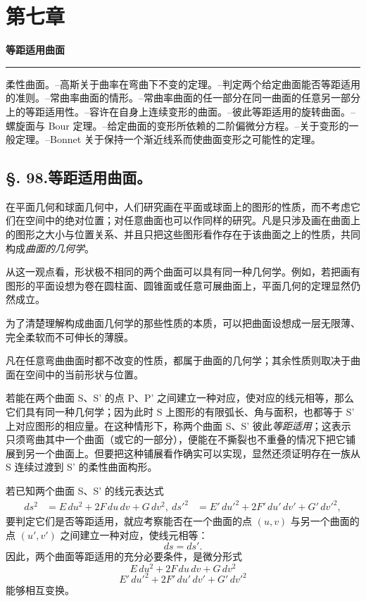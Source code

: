 \section*{第七章}
\begin{center}
{\Large\bfseries 等距适用曲面}
\end{center}
\begin{center}\rule{3em}{0.4pt}\end{center}

\begin{center}\footnotesize
柔性曲面。--高斯关于曲率在弯曲下不变的定理。--判定两个给定曲面能否等距适用的准则。--常曲率曲面的情形。--常曲率曲面的任一部分在同一曲面的任意另一部分上的等距适用性。--容许在自身上连续变形的曲面。--彼此等距适用的旋转曲面。--螺旋面与 Bour 定理。--给定曲面的变形所依赖的二阶偏微分方程。--关于变形的一般定理。--Bonnet 关于保持一个渐近线系而使曲面变形之可能性的定理。
\end{center}

\subsection*{\S. 98.\quad 等距适用曲面。}

在平面几何和球面几何中，人们研究画在平面或球面上的图形的性质，而不考虑它们在空间中的绝对位置；对任意曲面也可以作同样的研究。凡是只涉及画在曲面上的图形之大小与位置关系、并且只把这些图形看作存在于该曲面之上的性质，共同构成\emph{曲面的几何学}。

从这一观点看，形状极不相同的两个曲面可以具有同一种几何学。例如，若把画有图形的平面设想为卷在圆柱面、圆锥面或任意可展曲面上，平面几何的定理显然仍然成立。

为了清楚理解构成曲面几何学的那些性质的本质，可以把曲面设想成一层无限薄、完全柔软而不可伸长的薄膜。

凡在任意弯曲曲面时都不改变的性质，都属于曲面的几何学；其余性质则取决于曲面在空间中的当前形状与位置。

若能在两个曲面 S、S' 的点 P、P' 之间建立一种对应，使对应的线元相等，那么它们具有同一种几何学；因为此时 S 上图形的有限弧长、角与面积，也都等于 S' 上对应图形的相应量。在这种情形下，称两个曲面 S、S' 彼此\emph{等距适用}；这表示只须弯曲其中一个曲面（或它的一部分），便能在不撕裂也不重叠的情况下把它铺展到另一个曲面上。但要把这种铺展看作确实可以实现，显然还须证明存在一族从 S 连续过渡到 S' 的柔性曲面构形。

若已知两个曲面 S、S' 的线元表达式
\[
\begin{aligned}
 ds^2&=E\,du^2+2F\,du\,dv+G\,dv^2,\
 ds'^2&=E'\,du'^2+2F'\,du'\,dv'+G'\,dv'^2,
\end{aligned}
\]
要判定它们是否等距适用，就应考察能否在一个曲面的点 \((u,v)\) 与另一个曲面的点 \((u',v')\) 之间建立一种对应，使线元相等：
\[
 ds=ds'.
\]
因此，两个曲面等距适用的充分必要条件，是微分形式
\[
 E\,du^2+2F\,du\,dv+G\,dv^2
\]
\[
 E'\,du'^2+2F'\,du'\,dv'+G'\,dv'^2
\]
能够相互变换。

